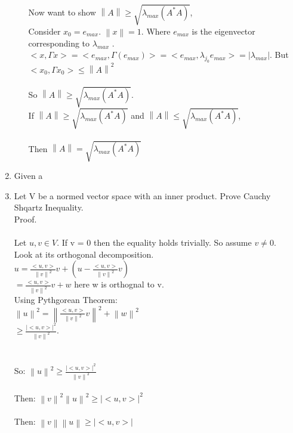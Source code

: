 \documentclass[11pt,leqno,fleqn]{article}
\newcommand{\norm}[1]{\left\lVert#1\right\rVert}
\begin{document}
\begin{enumerate}[(1)]
\begin{enumerate}[(a)]
Now want to show $\norm{A} \geq \sqrt{\lambda_{max}(A^*A)}$, \\
Consider $x_0 = e_{max}$. $\norm{x} = 1$. Where $e_{max}$ is the eigenvector corresponding to $\lambda_{max}$ .\\
$<x,\Gamma x> = <e_{max}, \Gamma(e_{max})> = <e_{max}, \lambda_{j_0} e_{max}> = |\lambda_{max}| $.
But $<x_0, \Gamma x_0> \leq \norm{A}^2$ \\ \\
So  $\norm{A} \geq \sqrt{\lambda_{max}(A^*A)}$.\\ 

If  $\norm{A} \geq \sqrt{\lambda_{max}(A^*A)}$ and  $\norm{A} \leq \sqrt{\lambda_{max}(A^*A)}$,\\ \\
Then  $\norm{A} = \sqrt{\lambda_{max}(A^*A)}$


	
 \end{enumerate}
 
 \item 
 Given a 
 
 \item Let V be a normed vector space with an inner product. Prove Cauchy Shqartz Inequality. \\
 Proof.\\ \\
 Let $u,v \in V$. If v = 0 then the equality holds trivially. So assume $v \neq 0$. \\
 Look at its orthogonal decomposition.\\
 $u = \frac{<u,v>}{\norm{v}^2} v + (u - \frac{<u,v>}{\norm{v}^2}v)$\\
 $= \frac{<u,v>}{\norm{v}^2} v + w$ here w is orthognal to v.\\
 Using Pythgorean Theorem:\\
 $\norm{u}^2 = \norm{\frac{<u,v>}{\norm{v}^2} v}^2 + \norm{w}^2$\\
 $\geq \frac{|<u,v>|^2}{\norm{v}^2}$.\\ \\ \\
 So:
 $\norm{u}^2 \geq \frac{|<u,v>|^2}{\norm{v}^2}$\\ \\
 Then: $ \norm{v}^2 \norm{u}^2 \geq |<u,v>|^2 $\\ \\
 Then:  $ \norm{v} \norm{u} \geq |<u,v>| $
  
  \end{enumerate}
 
 
\end{document}
